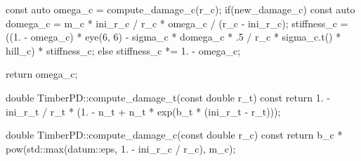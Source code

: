 \begin{cppcode}
{    const auto omega_c = compute_damage_c(r_c);
    if(new_damage_c) {
        const auto domega_c = m_c * ini_r_c / r_c * omega_c / (r_c - ini_r_c);
        stiffness_c = ((1. - omega_c) * eye(6, 6) - sigma_c * domega_c * .5 / r_c * sigma_c.t() * hill_c) * stiffness_c;
    }
    else stiffness_c *= 1. - omega_c;

    return omega_c;
}

double TimberPD::compute_damage_t(const double r_t) const { return 1. - ini_r_t / r_t * (1. - n_t + n_t * exp(b_t * (ini_r_t - r_t))); }

double TimberPD::compute_damage_c(const double r_c) const { return b_c * pow(std::max(datum::eps, 1. - ini_r_c / r_c), m_c); }
\end{cppcode}
